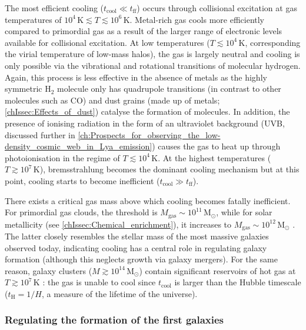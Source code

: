 The most efficient cooling ($t_\text{cool} \ll t_\text{ff}$) occurs through collisional excitation at gas temperatures of $10^4 \, \mathrm{K} \lesssim T \lesssim 10^6 \, \mathrm{K}$. Metal-rich gas cools more efficiently compared to primordial gas as a result of the larger range of electronic levels available for collisional excitation. At low temperatures ($T \lesssim 10^4 \, \mathrm{K}$, corresponding the virial temperature of low-mass halos), the gas is largely neutral and cooling is only possible via the vibrational and rotational transitions of molecular hydrogen. Again, this process is less effective in the absence of metals as the highly symmetric $\mathrm{H_2}$ molecule only has quadrupole transitions (in contrast to other molecules such as $\mathrm{CO}$) and dust grains (made up of metals; \cref{chIssec:Effects_of_dust}) catalyse the formation of molecules. In addition, the presence of ionising radiation in the form of an ultraviolet background (UVB, discussed further in \cref{ch:Prospects_for_observing_the_low-density_cosmic_web_in_Lya_emission}) causes the gas to heat up through photoionisation in the regime of $T \lesssim 10^4 \, \mathrm{K}$. At the highest temperatures ($T \gtrsim 10^7 \, \mathrm{K}$), bremsstrahlung becomes the dominant cooling mechanism but at this point, cooling starts to become inefficient ($t_\text{cool} \gg t_\text{ff}$).

There exists a critical gas mass above which cooling becomes fatally inefficient. For primordial gas clouds, the threshold is $M_\text{gas} \sim 10^{11} \, \mathrm{M_\odot}$, while for solar metallicity (see \cref{chIssec:Chemical_enrichment}), it increases to $M_\text{gas} \sim 10^{12} \, \mathrm{M_\odot}$ \citep[e.g.][]{1977MNRAS.179..541R, 1978MNRAS.183..341W}. The latter closely resembles the stellar mass of the most massive galaxies observed today, indicating cooling has a central role in regulating galaxy formation (although this neglects growth via galaxy mergers). For the same reason, galaxy clusters ($M \gtrsim 10^{14} \, \mathrm{M_\odot}$) contain significant reservoirs of hot gas at $T \gtrsim 10^{7} \, \mathrm{K}$ \citep[which can be observed in X-ray emission; e.g.][]{2001ApJ...546...63T}: the gas is unable to cool since $t_\text{cool}$ is larger than the Hubble timescale ($t_\text{H} = 1/H$, a measure of the lifetime of the universe).

\subsubsection{Regulating the formation of the first galaxies}
\label{chIsssec:Regulating_the_formation_of_the_first_galaxies}


